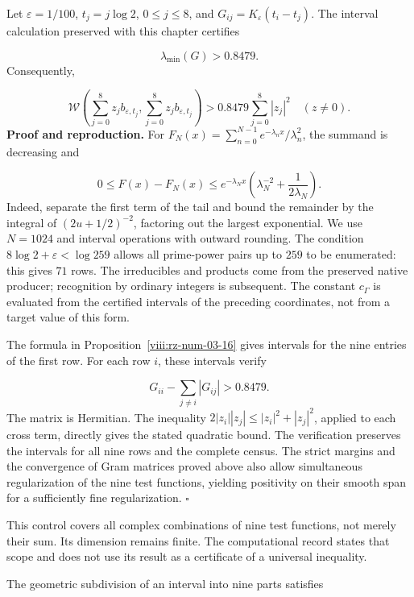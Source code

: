 Let \(\varepsilon=1/100\), \(t_j=j\log2\), \(0\leq j\leq8\), and \(G_{ij}=K_\varepsilon(t_i-t_j)\). The interval calculation preserved with this chapter certifies

\[
\lambda_{\min}(G)>0.8479.
\]
Consequently,

\[
\mathscr W\left(\sum_{j=0}^8z_jb_{\varepsilon,t_j},
\sum_{j=0}^8z_jb_{\varepsilon,t_j}\right)
>0.8479\sum_{j=0}^8|z_j|^2
\quad(z\neq0).
\]
\textbf{Proof and reproduction.} For \(F_N(x)=\sum_{n=0}^{N-1}e^{-\lambda_nx}/\lambda_n^2\), the summand is decreasing and

\[
0\leq F(x)-F_N(x)
\leq e^{-\lambda_Nx}
\left(\lambda_N^{-2}+\frac1{2\lambda_N}\right).
\]
Indeed, separate the first term of the tail and bound the remainder by the integral of \((2u+1/2)^{-2}\), factoring out the largest exponential. We use \(N=1024\) and interval operations with outward rounding. The condition \(8\log2+\varepsilon<\log259\) allows all prime-power pairs up to \(259\) to be enumerated: this gives \(71\) rows. The irreducibles and products come from the preserved native producer; recognition by ordinary integers is subsequent. The constant \(c_\Gamma\) is evaluated from the certified intervals of the preceding coordinates, not from a target value of this form.

The formula in Proposition~\ref{viii:rz-num-03-16} gives intervals for the nine entries of the first row. For each row \(i\), these intervals verify

\[
G_{ii}-\sum_{j\neq i}|G_{ij}|>0.8479.
\]
The matrix is Hermitian. The inequality \(2|z_i||z_j|\leq|z_i|^2+|z_j|^2\), applied to each cross term, directly gives the stated quadratic bound. The verification preserves the intervals for all nine rows and the complete census. The strict margins and the convergence of Gram matrices proved above also allow simultaneous regularization of the nine test functions, yielding positivity on their smooth span for a sufficiently fine regularization. \hfill\(\square\)

This control covers all complex combinations of nine test functions, not merely their sum. Its dimension remains finite. The computational record states that scope and does not use its result as a certificate of a universal inequality.

The geometric subdivision of an interval into nine parts satisfies

